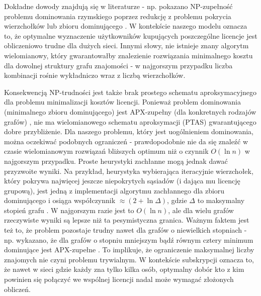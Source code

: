 Dokładne dowody znajdują się w literaturze - np. pokazano NP-zupełność problemu dominowania rzymskiego poprzez redukcję z problemu pokrycia wierzchołków lub zbioru dominującego \cite{chambers2009}. W kontekście naszego modelu oznacza to, że optymalne wyznaczenie użytkowników kupujących poszczególne licencje jest obliczeniowo trudne dla dużych sieci. Innymi słowy, nie istnieje znany algorytm wielomianowy, który gwarantowałby znalezienie rozwiązania minimalnego kosztu dla dowolnej struktury grafu znajomości - w najgorszym przypadku liczba kombinacji rośnie wykładniczo wraz z liczbą wierzchołków.

Konsekwencją NP-trudności jest także brak prostego schematu aproksymacyjnego dla problemu minimalizacji kosztów licencji. Ponieważ problem dominowania (minimalnego zbioru dominującego) jest APX-zupełny (dla konkretnych rodzajów grafów) \cite{POUREIDI2023106363}, nie ma wielomianowego schematu aproksymacji (PTAS) gwarantującego dobre przybliżenie. Dla naszego problemu, który jest uogólnieniem dominowania, można oczekiwać podobnych ograniczeń - prawdopodobnie nie da się znaleźć w czasie wielomianowym rozwiązań bliższych optimum niż o czynnik $O(\ln n)$ w najgorszym przypadku. Proste heurystyki zachłanne mogą jednak dawać przyzwoite wyniki. Na przykład, heurystyka wybierająca iteracyjnie wierzchołek, który pokrywa najwięcej jeszcze niepokrytych sąsiadów (i dająca mu licencję grupową), jest jedną z implementacji algorytmu zachłannego dla zbioru dominującego i osiąga współczynnik $\approx (2 + \ln \Delta)$, gdzie $\Delta$ to maksymalny stopień grafu \cite{Kuhn2012NetworkAlgorithms}. W najgorszym razie jest to $O(\ln n)$, ale dla wielu grafów rzeczywiste wyniki są lepsze niż ta pesymistyczna granica. Ważnym faktem jest też to, że problem pozostaje trudny nawet dla grafów o niewielkich stopniach - np. wykazano, że dla grafów o stopniu mniejszym bądź równym cztery minimum dominujące jest APX-zupełne \cite{ALIMONTI2000123, POUREIDI2023106363}. To implikuje, że ograniczenie maksymalnej liczby znajomych nie czyni problemu trywialnym. W kontekście subskrypcji oznacza to, że nawet w sieci gdzie każdy zna tylko kilka osób, optymalny dobór kto z kim powinien się połączyć we wspólnej licencji nadal może wymagać złożonych obliczeń.

